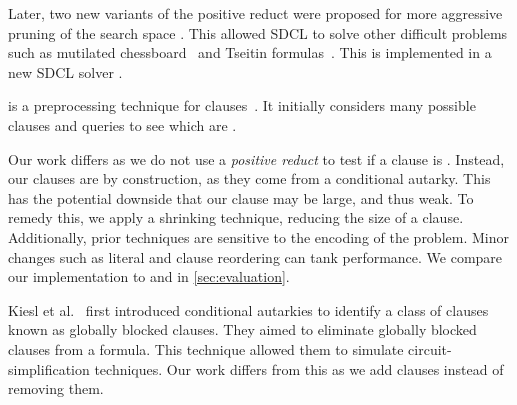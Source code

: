 Later, two new variants of the positive reduct were proposed for more aggressive
pruning of the search space \cite{sadical}. This allowed SDCL to solve other
difficult problems such as mutilated chessboard~\cite{mutilatedchessboard-pr} and
 Tseitin formulas~\cite{hardexamplesresolution}. This
is implemented in a new SDCL solver \sadical.


\prelearn is a preprocessing technique for \pr clauses~\cite{prelearn}. It
initially considers many possible clauses and queries \sadical to see which are
\pr.

Our work differs as we do not use a \emph{positive reduct} to test if a clause
is \pr. Instead, our clauses are \pr by construction, as they come from a
conditional autarky. This has the potential downside that our clause may be
large, and thus weak. To remedy this, we apply a shrinking technique, reducing
the size of a clause. Additionally, prior techniques are sensitive to the
encoding of the problem. Minor changes such as literal and clause reordering can
tank performance. We compare our
implementation \tool to \sadical and \prelearn in \autoref{sec:evaluation}.

Kiesl et al.~\cite{conditionalautarkies} first introduced conditional autarkies
to identify a class of \pr clauses known as globally blocked clauses. They aimed
to eliminate globally blocked clauses from a formula. This technique allowed
them to simulate circuit-simplification techniques. Our work differs from this
as we add clauses instead of removing them.

